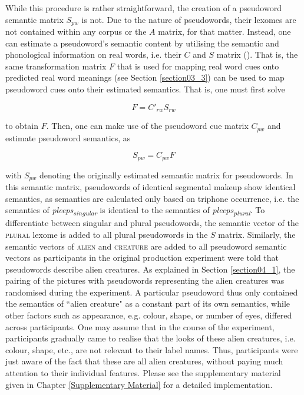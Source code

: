 While this procedure is rather straightforward, the creation of a pseudoword semantic matrix $S_{pw}$ is not. Due to the nature of pseudowords, their lexomes are not contained within any corpus or the $A$ matrix, for that matter. Instead, one can estimate a pseudoword’s semantic content by utilising the semantic and phonological information on real words, i.e. their $C$ and $S$ matrix (\cite{Chuang2021}). That is, the same transformation matrix $F$ that is used for mapping real word cues onto predicted real word meanings (see Section \ref{section03_3}) can be used to map pseudoword cues onto their estimated semantics. That is, one must first solve

\begin{equation}
\label{eq:FCSpw}
    F=C'_{rw}S_{rw}
\end{equation}

\noindent to obtain $F$. Then, one can make use of the pseudoword cue matrix $C_{pw}$ and estimate pseudoword semantics, as

\begin{equation}
\label{eq:SCFpw}
    S_{pw}=C_{pw}F
\end{equation}

\noindent with $S_{pw}$ denoting the originally estimated semantic matrix for pseudowords. In this semantic matrix, pseudowords of identical segmental makeup show identical semantics, as semantics are calculated only based on triphone occurrence, i.e. the semantics of \textit{pleeps\textsubscript{singular}} is identical to the semantics of \textit{pleeps\textsubscript{plural}}. To differentiate between singular and plural pseudowords, the semantic vector of the \textsc{plural} lexome is added to all plural pseudowords in the $S$ matrix. Similarly, the semantic vectors of \textsc{alien} and \textsc{creature} are added to all pseudoword semantic vectors as participants in the original production experiment were told that pseudowords describe alien creatures. As explained in Section \ref{section04_1}, the pairing of the pictures with pseudowords representing the alien creatures was randomised during the experiment. A particular pseudoword thus only contained the semantics of ``alien creature" as a constant part of its own semantics, while other factors such as appearance, e.g. colour, shape, or number of eyes, differed across participants. One may assume that in the course of the experiment, participants gradually came to realise that the looks of these alien creatures, i.e. colour, shape, etc., are not relevant to their label names. Thus, participants were just aware of the fact that these are all alien creatures, without paying much attention to their individual features. Please see the supplementary material given in Chapter \ref{Supplementary Material} for a detailed implementation.

